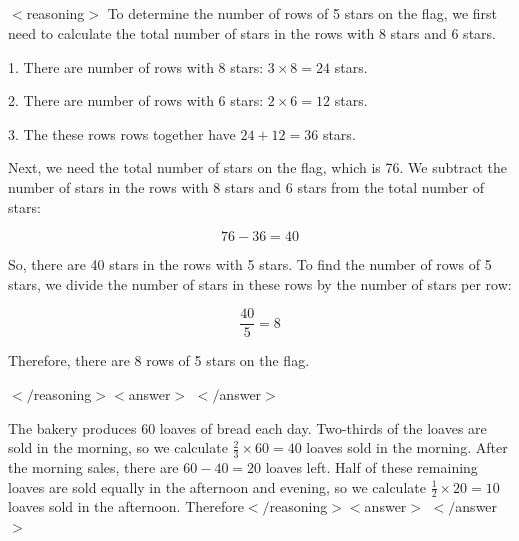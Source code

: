 \subsection{\grpo}
\begin{tcolorbox}[float, breakable, title=\textbf{Model:} LLaDA+\grpo \\ \textbf{Generation Sequence Length:} 512 \\ \textbf{Question:} A 76-star flag has three rows of 8 stars\, two rows of 6 stars and the rest are 5-star rows. How many rows of 5 stars are there altogether on the flag?]
$<$reasoning$>$
To determine the number of rows of 5 stars on the flag, we first need to calculate the total number of stars in the rows with 8 stars and 6 stars. 

1. There are number of rows with 8 stars: \(3 \times 8 = 24\) stars.

2. There are number of rows with 6 stars: \(2 \times 6 = 12\) stars.

3. The these rows rows together have \(24 + 12 = 36\) stars.

Next, we need the total number of stars on the flag, which is 76. We subtract the number of stars in the rows with 8 stars and 6 stars from the total number of stars:

\[ 76 - 36 = 40 \]

So, there are 40 stars in the rows with 5 stars. To find the number of rows of 5 stars, we divide the number of stars in these rows by the number of stars per row:

\[ \frac{40}{5} = 8 \]

Therefore, there are 8 rows of 5 stars on the flag.

$</$reasoning$>
<$answer$>$
\textcolor{green!70!black}{}
$</$answer$>$

\end{tcolorbox}
\begin{tcolorbox}[title=\textbf{Model:} LLaDA+\grpo \\ \textbf{Generation Sequence Length:} 512 \\ \textbf{Question:} A bakery produces 60 loaves of bread each day. Two-thirds of the loaves are sold in the morning and half of what is left is sold equally in the afternoon and evening. How many loaves of bread are sold in the afternoon?]
The bakery produces 60 loaves of bread each day. Two-thirds of the loaves are sold in the morning, so we calculate \(\frac{2}{3} \times 60 = 40\) loaves sold in the morning. After the morning sales, there are \(60 - 40 = 20\) loaves left. Half of these remaining loaves are sold equally in the afternoon and evening, so we calculate \(\frac{1}{2} \times 20 = 10\) loaves sold in the afternoon. Therefore$</$reasoning$>
<$answer$>$
\textcolor{red}{}
$</$answer$>$

\end{tcolorbox}
\clearpage
\newpage
